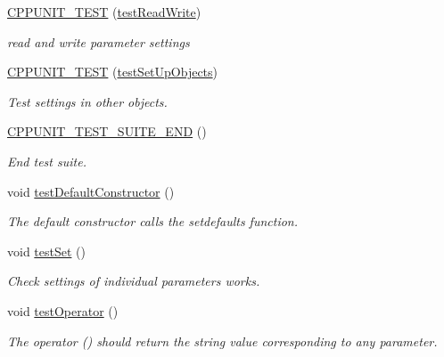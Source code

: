 \begin{DoxyCompactItemize}
\mbox{\label{classparameterTest_a02fb4f6ddf3874f79f120abfb0d56c82}} 
\mbox{\hyperlink{classparameterTest_a02fb4f6ddf3874f79f120abfb0d56c82}{C\+P\+P\+U\+N\+I\+T\+\_\+\+T\+E\+ST}} (\mbox{\hyperlink{classparameterTest_a73ffa897b723095fdb3f06cc309575d6}{test\+Read\+Write}})
\begin{DoxyCompactList}\small\item\em read and write parameter settings \end{DoxyCompactList}\item 
\mbox{\label{classparameterTest_a2346e04084e15821605e7da477af0fb3}} 
\mbox{\hyperlink{classparameterTest_a2346e04084e15821605e7da477af0fb3}{C\+P\+P\+U\+N\+I\+T\+\_\+\+T\+E\+ST}} (\mbox{\hyperlink{classparameterTest_aeb4d3a1620defdc974a9b925f4c1cd9f}{test\+Set\+Up\+Objects}})
\begin{DoxyCompactList}\small\item\em Test settings in other objects. \end{DoxyCompactList}\item 
\mbox{\label{classparameterTest_a051c68e665c44e09d98bffd0b6c7b78a}} 
\mbox{\hyperlink{classparameterTest_a051c68e665c44e09d98bffd0b6c7b78a}{C\+P\+P\+U\+N\+I\+T\+\_\+\+T\+E\+S\+T\+\_\+\+S\+U\+I\+T\+E\+\_\+\+E\+ND}} ()
\begin{DoxyCompactList}\small\item\em End test suite. \end{DoxyCompactList}\item 
void \mbox{\hyperlink{classparameterTest_a80bc49c4dafb3b6ae5c7e561b5711583}{test\+Default\+Constructor}} ()
\begin{DoxyCompactList}\small\item\em The default constructor calls the setdefaults function. \end{DoxyCompactList}\item 
void \mbox{\hyperlink{classparameterTest_ae8748da779947e5ddac496a38e1b07b8}{test\+Set}} ()
\begin{DoxyCompactList}\small\item\em Check settings of individual parameters works. \end{DoxyCompactList}\item 
void \mbox{\hyperlink{classparameterTest_a099ef3c9d0a74ada96f9dd8bd4c168e6}{test\+Operator}} ()
\begin{DoxyCompactList}\small\item\em The operator () should return the string value corresponding to any parameter. \end{DoxyCompactList}\item 

\end{DoxyCompactItemize}
